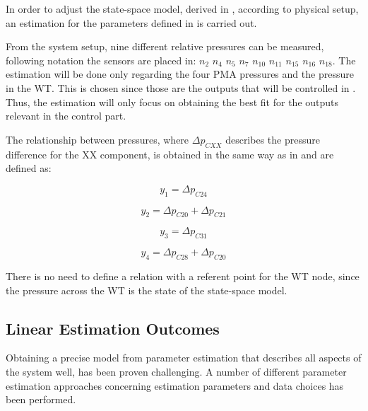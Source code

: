 In order to adjust the state-space model, derived in , according to physical setup, an estimation for the parameters defined in 
is carried out.

From the system setup, nine different relative pressures can be measured, following  notation the sensors are placed in: 
$n_2$ $n_4$ $n_5$ $n_7$ $n_{10}$ $n_{11}$ $n_{15}$ $n_{16}$ $n_{18}$. The estimation will be done only regarding the four PMA pressures and the pressure in the WT. This is chosen since those are the outputs that will be controlled in . Thus, the estimation will only focus on obtaining the best fit for the outputs relevant in the control part. 

The relationship between pressures, where $\Delta p_{CXX}$ describes the pressure difference for the XX component, is obtained in the same way as in  and are defined as:

\vspace{4mm}
\begin {equation}
     y_1 = \Delta p_{C24} 
\end{equation}

\vspace{4mm}
\begin {equation}
     y_2 = \Delta p_{C20} + \Delta p_{C21} 
\end{equation}


\vspace{4mm}
\begin {equation}
     y_3 = \Delta p_{C31} 
\end{equation}

\vspace{4mm}
\begin {equation}
     y_4 = \Delta p_{C28} + \Delta p_{C20}  
\end{equation}

There is no need to define a relation with a referent point for the WT node, since the pressure across the WT is the state of the state-space model. 


\subsection{Linear Estimation Outcomes}

Obtaining a precise model from parameter estimation that describes all aspects of the system well, has been proven challenging. A number of different parameter estimation approaches concerning estimation parameters and data choices has been performed.   

